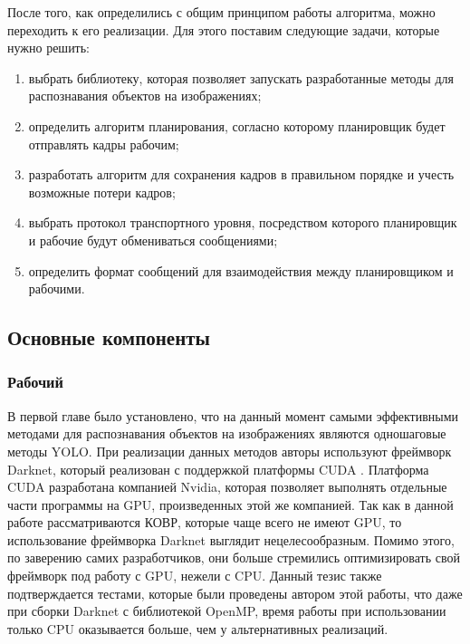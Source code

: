 
После того, как определились с общим принципом работы алгоритма, можно переходить к его реализации. Для этого поставим 
следующие задачи, которые нужно решить:

\begin{enumerate}
\item выбрать библиотеку, которая позволяет запускать разработанные методы для распознавания объектов на изображениях;
\item определить алгоритм планирования, согласно которому планировщик будет отправлять кадры рабочим;
\item разработать алгоритм для сохранения кадров в правильном порядке и учесть возможные потери кадров;
\item выбрать протокол транспортного уровня, посредством которого планировщик и рабочие будут обмениваться сообщениями;
\item определить формат сообщений для взаимодействия между планировщиком и рабочими.
\end{enumerate}

\subsection{Основные компоненты}

\subsubsection{Рабочий}

В первой главе было установлено, что на данный момент самыми эффективными методами для распознавания объектов на изображениях
являются одношаговые методы YOLO. При реализации данных методов авторы используют фреймворк Darknet, который реализован с 
поддержкой платформы CUDA \cite{DARKNET}. Платформа CUDA разработана компанией Nvidia, которая позволяет выполнять отдельные
части программы на GPU, произведенных этой же компанией. Так как в данной работе рассматриваются КОВР, которые чаще всего 
не имеют GPU, то использование фреймворка Darknet выглядит нецелесообразным. Помимо этого, по заверению самих разработчиков, они 
больше стремились оптимизировать свой фреймворк под работу с GPU, нежели с CPU. Данный тезис также подтверждается тестами, 
которые были проведены автором этой работы, что даже при сборки Darknet с библиотекой OpenMP, время работы при использовании 
только CPU оказывается больше, чем у альтернативных реализаций.

